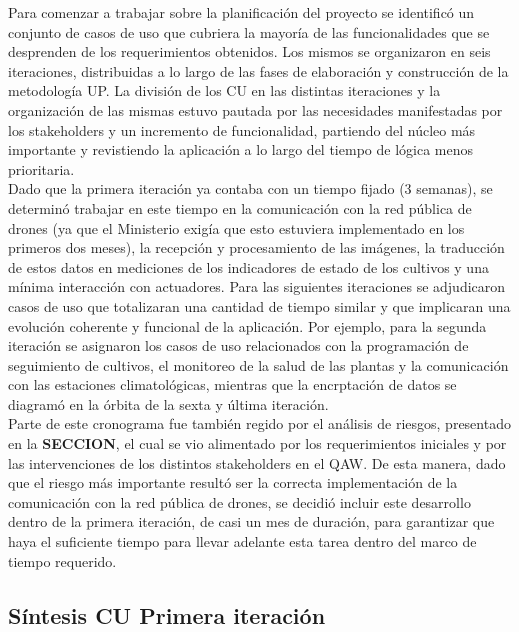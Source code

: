 Para comenzar a trabajar sobre la planificación del proyecto se identificó un conjunto de casos de uso que cubriera la mayoría de las funcionalidades que se desprenden de los requerimientos obtenidos. Los mismos se organizaron en seis iteraciones, distribuidas a lo largo de las fases de elaboración y construcción de la metodología UP. La división de los CU en las distintas iteraciones y la organización de las mismas estuvo pautada por las necesidades manifestadas por los stakeholders y un incremento de funcionalidad, partiendo del núcleo más importante y revistiendo la aplicación a lo largo del tiempo de lógica menos prioritaria.\\
\indent Dado que la primera iteración ya contaba con un tiempo fijado (3 semanas), se determinó trabajar en este tiempo en la comunicación con la red pública de drones (ya que el Ministerio exigía que esto estuviera implementado en los primeros dos meses), la recepción y procesamiento de las imágenes, la traducción de estos datos en mediciones de los indicadores de estado de los cultivos y una mínima interacción con actuadores. Para las siguientes iteraciones se adjudicaron casos de uso que totalizaran una cantidad de tiempo similar y que implicaran una evolución coherente y funcional de la aplicación. Por ejemplo, para la segunda iteración se asignaron los casos de uso relacionados con la programación de seguimiento de cultivos, el monitoreo de la salud de las plantas y la comunicación con las estaciones climatológicas, mientras que la encrptación de datos se diagramó en la órbita de la sexta y última iteración.\\
\indent Parte de este cronograma fue también regido por el análisis de riesgos, presentado en la \textbf{SECCION}, el cual se vio alimentado por los requerimientos iniciales y por las intervenciones de los distintos stakeholders en el QAW. De esta manera, dado que el riesgo más importante resultó ser la correcta implementación de la comunicación con la red pública de drones, se decidió incluir este desarrollo dentro de la primera iteración, de casi un mes de duración, para garantizar que haya el suficiente tiempo para llevar adelante esta tarea dentro del marco de tiempo requerido.

\subsection{Síntesis CU Primera iteración}
		
